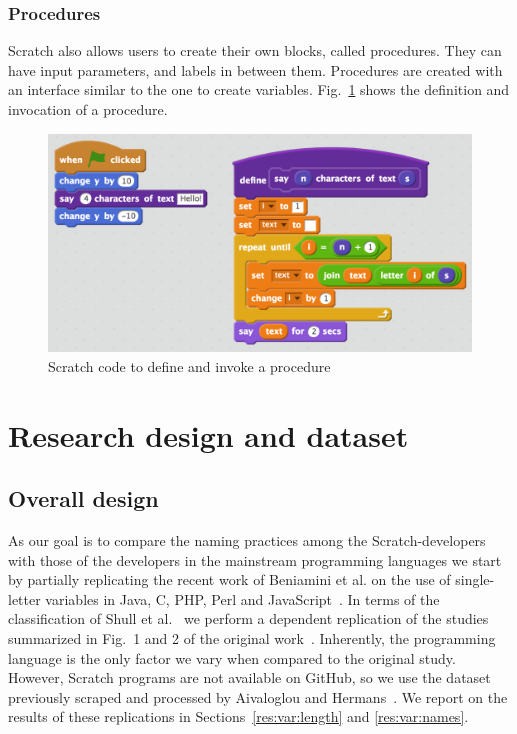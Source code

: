 \documentclass[conference]{IEEEtran}
\begin{document}
\subsubsection{Procedures} \label {sec:Scratch_func}
Scratch also allows users to create their own blocks, called procedures. They can have input parameters, and labels in between them. Procedures are created with an interface similar to the one to create variables. Fig.~\ref{fig:procedures} shows the definition and invocation of a procedure.

\begin{figure}
  \begin{center}
  \includegraphics[width=\columnwidth]{fig/procedures2.png}
  \caption{Scratch code to define and invoke a procedure}
  \label{fig:procedures}
  \end{center}
\end{figure} 


\section{Research design and dataset}
\subsection{Overall design}
\label{sec:design}
As our goal is to compare the naming practices among the Scratch-developers with those of the developers in the mainstream programming languages we start by partially replicating the recent work of Beniamini et al. on the use of single-letter variables in Java, C, PHP, Perl and JavaScript~\cite{Beniamini}. 
In terms of the classification of Shull et al.~\cite{Shull2008} we perform a dependent replication of the studies summarized in Fig.~1 and 2 of the original work~\cite{Beniamini}.  
Inherently, the programming language is the only factor we vary when compared to the original study. 
However, Scratch programs are not available on GitHub, so we use the dataset previously scraped and processed by Aivaloglou and Hermans~\cite{Aivaloglou2016HowKC}. 
We report on the results of these replications in Sections~\ref{res:var:length} and \ref{res:var:names}.
\end{document}
